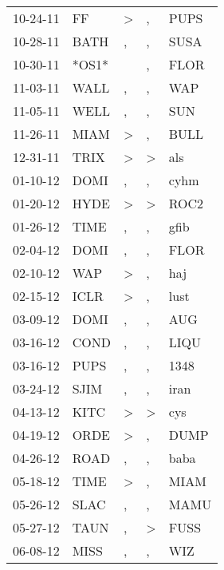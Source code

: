 \begin{supertabular}{lllll}
 10-24-11 &     FF &     \textgreater &                , &   PUPS \\
 10-28-11 &   BATH &                , &                , &   SUSA \\
 10-30-11 &  *OS1* &                  &                , &   FLOR \\
 11-03-11 &   WALL &                , &                , &    WAP \\
 11-05-11 &   WELL &                , &                , &    SUN \\
 11-26-11 &   MIAM &     \textgreater &                , &   BULL \\
 12-31-11 &   TRIX &     \textgreater &     \textgreater &    als \\
 01-10-12 &   DOMI &                , &                , &   cyhm \\
 01-20-12 &   HYDE &     \textgreater &     \textgreater &   ROC2 \\
 01-26-12 &   TIME &                , &                , &   gfib \\
 02-04-12 &   DOMI &                , &                , &   FLOR \\
 02-10-12 &    WAP &     \textgreater &                , &    haj \\
 02-15-12 &   ICLR &     \textgreater &                , &   lust \\
 03-09-12 &   DOMI &                , &                , &    AUG \\
 03-16-12 &   COND &                , &                , &   LIQU \\
 03-16-12 &   PUPS &                , &                , &   1348 \\
 03-24-12 &   SJIM &                , &                , &   iran \\
 04-13-12 &   KITC &     \textgreater &     \textgreater &    cys \\
 04-19-12 &   ORDE &     \textgreater &                , &   DUMP \\
 04-26-12 &   ROAD &                , &                , &   baba \\
 05-18-12 &   TIME &     \textgreater &                , &   MIAM \\
 05-26-12 &   SLAC &                , &                , &   MAMU \\
 05-27-12 &   TAUN &                , &     \textgreater &   FUSS \\
 06-08-12 &   MISS &                , &                , &    WIZ \\

\end{supertabular}
